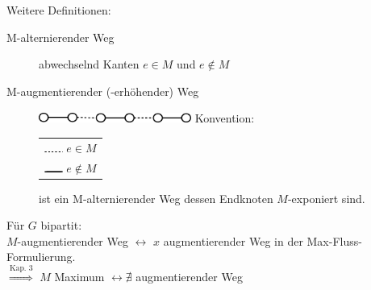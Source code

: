 Weitere Definitionen:
\begin{description}
\item[M-alternierender Weg] abwechselnd Kanten $e \in M$ und $e \notin M$
\item[M-augmentierender (-erhöhender) Weg] \mbox{}

\includegraphics[width=5cm]{bilder/5-1augmWeg} \hspace{5mm} Konvention:
\begin{tabular}[c]{l}\includegraphics[width=0.6cm]{bilder/5-1augmWegKonv1}
$e \in M$\\
\includegraphics[width=0.6cm]{bilder/5-1augmWegKonv2} $e \notin M$
\end{tabular}

ist ein M-alternierender Weg dessen Endknoten $M$-exponiert sind.
\end{description}
Für $G$ bipartit:\\
$M$-augmentierender Weg $\leftrightarrow$ $x$ augmentierender Weg in der
Max-Fluss-Formulierung.\\
$\stackrel{\mbox{Kap. 3}}{\Rightarrow}$ $M$ Maximum $\leftrightarrow
\nexists$  augmentierender Weg

